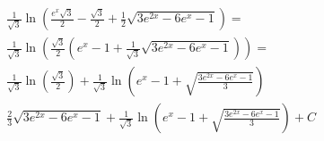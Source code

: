 \documentclass{article}
\begin{document}
$$
\begin{aligned}
& \frac{1}{\sqrt{3}} \ln \left(\frac{e^x \sqrt{3}}{2}-\frac{\sqrt{3}}{2}+\frac{1}{2} \sqrt{3 e^{2 x}-6 e^x-1}\right)= \\
& \frac{1}{\sqrt{3}} \ln \left(\frac{\sqrt{3}}{2}\left(e^x-1+\frac{1}{\sqrt{3}} \sqrt{3 e^{2 x}-6 e^x-1}\right)\right)= \\
& \frac{1}{\sqrt{3}} \ln \left(\frac{\sqrt{3}}{2}\right)+\frac{1}{\sqrt{3}} \ln \left(e^x-1+\sqrt{\frac{3 e^{2 x}-6 e^x-1}{3}}\right) \\
& \frac{2}{3} \sqrt{3 e^{2 x}-6 e^x-1}+\frac{1}{\sqrt{3}} \ln \left(e^x-1+\sqrt{\frac{3 e^{2 x}-6 e^x-1}{3}}\right)+C
\end{aligned}
$$
\end{document}
